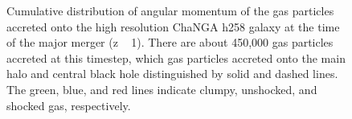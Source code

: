 \documentclass[manuscript]{aastex}
\begin{document}
\begin{figure}
\centerline{}
\caption[]{ Cumulative distribution of angular momentum of the gas particles accreted onto the high resolution ChaNGA h258 galaxy at the time of the major merger (z ~ 1). There are about 450,000 gas particles accreted at this timestep, which gas particles accreted onto the main halo and central black hole distinguished by solid and dashed lines. The green, blue, and red lines indicate clumpy, unshocked, and shocked gas, respectively.}
\label{hrh258angmom_merger} 
\end{figure}
\end{document}
